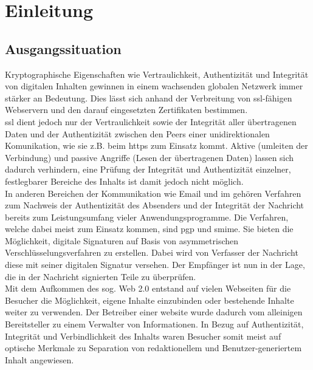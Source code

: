 
\chapter{Einleitung}
%
\label{chp:Einleitung}

\section{Ausgangssituation}
%
\label{sec:Einleitung:ausgangssituation}
Kryptographische Eigenschaften wie Vertraulichkeit, Authentizität und Integrität von digitalen Inhalten gewinnen in einem wachsenden globalen Netzwerk immer
stärker an Bedeutung. Dies lässt sich anhand der Verbreitung von \gls{ssl}-fähigen Webservern und den darauf eingesetzten Zertifikaten bestimmen\cite{ssliverse:eff}.\\

\gls{ssl} dient jedoch nur der Vertraulichkeit sowie der Integrität aller übertragenen Daten und der Authentizität zwischen den Peers einer unidirektionalen
Komunikation, wie sie z.B. beim \gls{https} zum Einsatz kommt\cite{kits}. Aktive (umleiten der Verbindung) und passive Angriffe (Lesen der übertragenen Daten)
lassen sich dadurch verhindern, eine Prüfung der Integrität und Authentizität einzelner, festlegbarer Bereiche des Inhalts ist damit jedoch nicht möglich.\\

In anderen Bereichen der Kommunikation wie Email und \gls{im} gehören Verfahren zum Nachweis der Authentizität des Absenders und der Integrität der Nachricht
bereits zum Leistungsumfang vieler Anwendungsprogramme\cite{2719799020071101}. Die Verfahren, welche dabei meist zum Einsatz kommen, sind \gls{pgp} und
\gls{smime}. Sie bieten die Möglichkeit, digitale Signaturen auf Basis von asymmetrischen Verschlüsselungsverfahren zu erstellen\cite{kits}. Dabei wird von
Verfasser der Nachricht diese mit seiner digitalen Signatur versehen. Der Empfänger ist nun in der Lage, die in der Nachricht signierten Teile zu überprüfen.\\

Mit dem Aufkommen des sog. Web 2.0 entstand auf vielen Webseiten für die Besucher die Möglichkeit, eigene Inhalte einzubinden oder bestehende Inhalte weiter zu
verwenden. Der Betreiber einer \gls{website} wurde dadurch vom alleinigen Bereitsteller zu einem Verwalter von Informationen. In Bezug auf Authentizität,
Integrität und Verbindlichkeit des Inhalts waren Besucher somit meist auf optische Merkmale zu Separation von redaktionellem und Benutzer-generiertem Inhalt
angewiesen.\\

